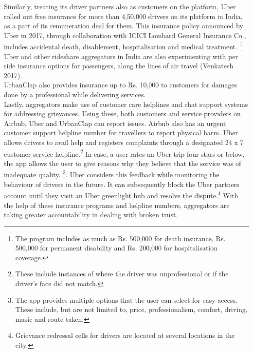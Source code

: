 \documentclass[a4paper, 12pt]{article}
\begin{document}
Similarly, treating its driver partners also as customers on the platform, Uber rolled out free insurance for more than 4,50,000 drivers on its platform in India, as a part of its remuneration deal for them. This insurance policy announced by Uber in 2017, through collaboration with ICICI Lombard General Insurance Co., includes accidental death, disablement, hospitalisation and medical treatment. \footnote{The program includes as much as Rs. 500,000 for death insurance, Rs. 500,000 for permanent disability and Rs. 200,000 for hospitalisation coverage.}  Uber and other rideshare aggregators in India are also experimenting with per ride insurance options for passengers, along the lines of air travel (Venkatesh 2017). \\
                    
                    UrbanClap also provides insurance up to Rs. 10,000 to customers for damages done by a professional while delivering services. \\

Lastly, aggregators make use of customer care helplines and chat support systems for addressing grievances. Using these, both customers and service providers on Airbnb, Uber and UrbanClap can report issues. Airbnb also has an urgent customer support helpline number for travellers to report physical harm. Uber allows drivers to avail help and registers complaints through a designated 24 x 7 customer service helpline.\footnote{These include instances of where the driver was unprofessional or if the driver’s face did not match.}  In case, a user rates an Uber trip four stars or below, the app allows the user to give reasons why they believe that the service was of inadequate quality. \footnote{The app provides multiple options that the user can select for easy access. These include, but are not limited to, price, professionalism, comfort, driving, music and route taken. }.  Uber considers this feedback while monitoring the behaviour of drivers in the future. It can subsequently block the Uber partners account until they visit an Uber greenlight hub and resolve the dispute.\footnote{Grievance redressal cells for drivers are located at several locations in the city.}  With the help of these insurance programs and helpline numbers, aggregators are taking greater accountability in dealing with broken trust.\\
\end{document}
